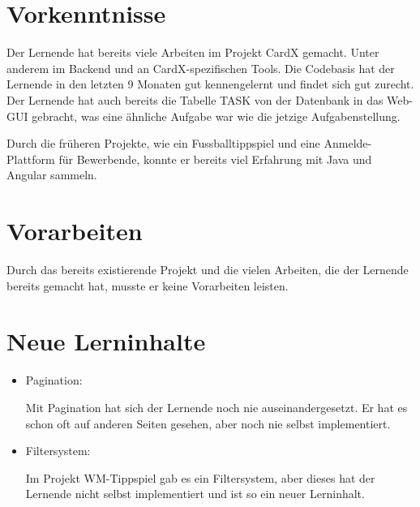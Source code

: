 \section{Vorkenntnisse}\label{sec:vorkenntnisse}
Der Lernende hat bereits viele Arbeiten im Projekt CardX gemacht. Unter anderem im Backend und an CardX-spezifischen Tools. Die Codebasis hat der Lernende in den letzten 9 Monaten gut kennengelernt und findet sich gut zurecht. Der Lernende hat auch bereits die Tabelle TASK von der Datenbank in das Web-GUI gebracht, was eine ähnliche Aufgabe war wie die jetzige Aufgabenstellung.

Durch die früheren Projekte, wie ein Fussballtippspiel und eine Anmelde-Plattform für Bewerbende, konnte er bereits viel Erfahrung mit Java und Angular sammeln.

\section{Vorarbeiten}\label{sec:vorarbeiten}
Durch das bereits existierende Projekt und die vielen Arbeiten, die der Lernende bereits gemacht hat, musste er keine Vorarbeiten leisten.

\section{Neue Lerninhalte}\label{sec:neue-lerninhalte}
\begin{itemize}
    \item Pagination: 
    
    Mit Pagination hat sich der Lernende noch nie auseinandergesetzt. Er hat es schon oft auf anderen Seiten gesehen, aber noch nie selbst implementiert.
    \item Filtersystem:
    
    Im Projekt WM-Tippspiel gab es ein Filtersystem, aber dieses hat der Lernende nicht selbst implementiert und ist so ein neuer Lerninhalt.
\end{itemize}

